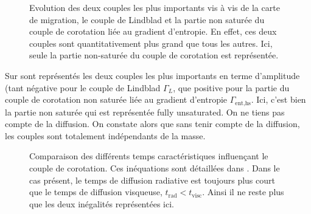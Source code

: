 \begin{figure}[htb]
\centering
{}\hfill
{}

\caption{Evolution des deux couples les plus importants vis à vis de la carte de migration, le couple de Lindblad et la partie non saturée du couple de corotation liée au gradient d'entropie. En effet, ces deux couples sont quantitativement plus grand que tous les autres. Ici, seule la partie non-saturée du couple de corotation est représentée.}\label{fig:details_maps}
\end{figure}

Sur  sont représentés les deux couples les plus importants en terme d'amplitude (tant négative pour le couple de Lindblad $\Gamma_L$, que positive pour la partie du couple de corotation non saturée liée au gradient d'entropie $\Gamma_\text{ent,hs}$. Ici, c'est bien la partie non saturée qui est représentée \og fully unsaturated\fg. On ne tiens pas compte de la diffusion. On constate alors que sans tenir compte de la diffusion, les couples sont totalement indépendants de la masse. 

\begin{figure}[htb]
\centering
{}\hfill
{}

\caption{Comparaison des différents temps caractéristiques influençant le couple de corotation. Ces inéquations sont détaillées dans . Dans le cas présent, le temps de diffusion radiative est toujours plus court que le temps de diffusion visqueuse, $t_\text{rad}<t_\text{visc}$. Ainsi il ne reste plus que les deux inégalités représentées ici.}\label{fig:timescales_maps}
\end{figure}

